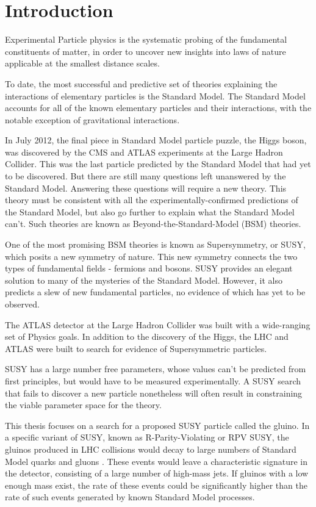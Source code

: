 \chapter{Introduction} \label{ch:intro}

Experimental Particle physics is the systematic probing of the fundamental constituents of matter,
in order to uncover new insights into laws of nature applicable at the smallest distance scales.

To date, the most successful and predictive set of theories explaining the interactions of elementary particles is the Standard Model.
The Standard Model accounts for all of the known elementary particles and their interactions, with the notable exception of gravitational interactions.

In July 2012, the final piece in Standard Model particle puzzle, the Higgs boson, was discovered by the CMS and ATLAS experiments at the
Large Hadron Collider.
This was the last particle predicted by the Standard Model that had yet to be discovered.
But there are still many questions left unanswered by the Standard Model.
Answering these questions will require a new theory.
This theory must be consistent with all the experimentally-confirmed predictions of the Standard Model,
but also go further to explain what the Standard Model can't.
Such theories are known as Beyond-the-Standard-Model (BSM) theories.

One of the most promising BSM theories is known as Supersymmetry, or SUSY, which posits a new symmetry of nature.
This new symmetry connects the two types of fundamental fields - fermions and bosons.
SUSY provides an elegant solution to many of the mysteries of the Standard Model.
However, it also predicts a slew of new fundamental particles, no evidence of which has yet to be observed.

The ATLAS detector at the Large Hadron Collider was built with a wide-ranging set of Physics goals.
In addition to the discovery of the Higgs, the LHC and ATLAS were built to search for evidence of Supersymmetric particles.

SUSY has a large number free parameters, whose values can't be predicted from first principles, but would have to be measured experimentally.
A SUSY search that fails to discover a new particle nonetheless will often result in constraining the viable parameter space for the theory.

This thesis focuses on a search for a proposed SUSY particle called the gluino.
In a specific variant of SUSY, known as R-Parity-Violating or RPV SUSY, the gluinos produced in LHC collisions would
decay to large numbers of Standard Model quarks and gluons .
These events would leave a characteristic signature in the detector, consisting of a large number of high-mass jets.
If gluinos with a low enough mass exist, the rate of these events could be significantly higher than the rate of such events
generated by known Standard Model processes.

